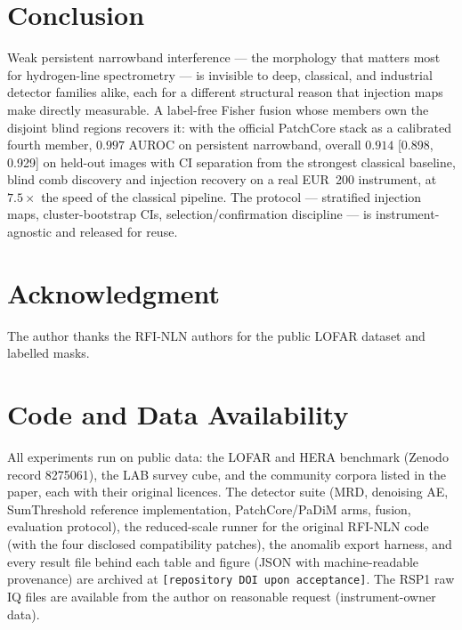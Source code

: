 \documentclass[journal]{IEEEtran}
\begin{document}
\section{Conclusion}
Weak persistent narrowband interference --- the morphology that matters most
for hydrogen-line spectrometry --- is invisible to deep, classical, and
industrial detector families alike, each for a different structural reason
that injection maps make directly measurable.  A label-free
Fisher fusion whose members own the disjoint blind regions recovers it:
with the official PatchCore stack as a calibrated fourth member,
$0.997$ AUROC on persistent narrowband, overall $0.914$ [0.898, 0.929] on
held-out images
with CI separation from the strongest classical baseline, blind comb
discovery and injection recovery on a real EUR~200 instrument, at
$7.5\times$ the speed of the classical pipeline.  The protocol --- stratified
injection maps, cluster-bootstrap CIs, selection/confirmation discipline ---
is instrument-agnostic and released for reuse.

\section*{Acknowledgment}
The author thanks the RFI-NLN authors for the public LOFAR dataset and
labelled masks.

\section*{Code and Data Availability}
All experiments run on public data: the LOFAR and HERA benchmark
(Zenodo record 8275061), the LAB survey cube, and the community
corpora listed in the paper, each with their original licences.  The
detector suite (MRD, denoising AE, SumThreshold reference
implementation, PatchCore/PaDiM arms, fusion, evaluation protocol),
the reduced-scale runner for the original RFI-NLN code (with the four
disclosed compatibility patches), the anomalib export harness, and
every result file behind each table and figure (JSON with
machine-readable provenance) are archived at
\texttt{[repository DOI upon acceptance]}.  The RSP1 raw IQ files are
available from the author on reasonable request (instrument-owner
data).
\end{document}
